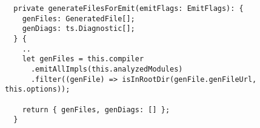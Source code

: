 \begin{verbatim}
  private generateFilesForEmit(emitFlags: EmitFlags): {
    genFiles: GeneratedFile[];
    genDiags: ts.Diagnostic[];
  } {
    ..
    let genFiles = this.compiler
      .emitAllImpls(this.analyzedModules)
      .filter((genFile) => isInRootDir(genFile.genFileUrl, this.options));

    return { genFiles, genDiags: [] };
  }
\end{verbatim}
